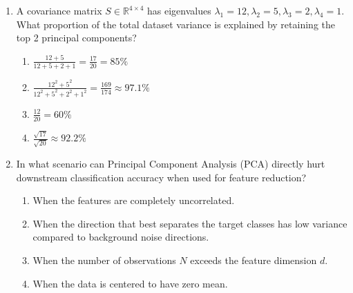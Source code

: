\begin{enumerate}[label=\textbf{MCQ\arabic*.}]
    \item A covariance matrix $S \in \mathbb{R}^{4 \times 4}$ has eigenvalues $\lambda_1 = 12, \lambda_2 = 5, \lambda_3 = 2, \lambda_4 = 1$. What proportion of the total dataset variance is explained by retaining the top 2 principal components?
    \begin{enumerate}[label=(\alph*)]
        \item $\frac{12 + 5}{12 + 5 + 2 + 1} = \frac{17}{20} = 85\%$
        \item $\frac{12^2 + 5^2}{12^2 + 5^2 + 2^2 + 1^2} = \frac{169}{174} \approx 97.1\%$
        \item $\frac{12}{20} = 60\%$
        \item $\frac{\sqrt{17}}{\sqrt{20}} \approx 92.2\%$
    \end{enumerate}

    \item In what scenario can Principal Component Analysis (PCA) directly hurt downstream classification accuracy when used for feature reduction?
    \begin{enumerate}[label=(\alph*)]
        \item When the features are completely uncorrelated.
        \item When the direction that best separates the target classes has low variance compared to background noise directions.
        \item When the number of observations $N$ exceeds the feature dimension $d$.
        \item When the data is centered to have zero mean.
    \end{enumerate}
\end{enumerate}
